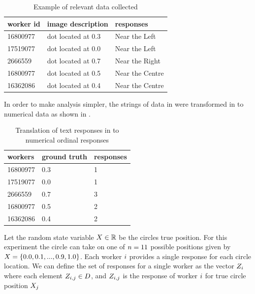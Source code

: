 \begin{table}
\centering
    \begin{tabular}{|l|l|l|}
    \hline
    \textbf{worker id} &    \textbf{image description} & \textbf{responses}       \\ \hline
    16800977      & dot located at 0.3   & Near the Left   \\
    17519077      & dot located at 0.0   & Near the Left   \\
    2666559       & dot located at 0.7   & Near the Right  \\
    16800977      & dot located at 0.5   & Near the Centre \\
    16362086      & dot located at 0.4   & Near the Centre \\ \hline
    \end{tabular}
    \caption{Example of relevant data collected}
  \label{Table:text responses}
\end{table}


In order to make analysis simpler, the strings of data in  were transformed in to numerical data as shown in .


\begin{table}
\centering
    \begin{tabular}{|l|l|l|}
    \hline
    \textbf{workers}  & \textbf{ground truth} & \textbf{responses} \\ \hline
    16800977 & 0.3          & 1         \\
    17519077 & 0.0          & 1         \\
    2666559  & 0.7          & 3         \\
    16800977 & 0.5          & 2         \\
    16362086 & 0.4          & 2         \\ \hline
    \end{tabular}
    \caption{Translation of text responses in to numerical ordinal responses }
  \label{Table:ordinal responses}
\end{table}





Let the random state variable $X \in \mathbb{R}$ be the circles true position. For this experiment the circle can take on one of $n=11$ possible positions given by $X = \lbrace 0.0,0.1,...,0.9,1.0 \rbrace$. Each worker $i$ provides a single response for each circle location. We can define the set of responses for a single worker as the vector $Z_i$ where each element $Z_{i,j} \in D$, and $Z_{i,j}$ is the response of worker $i$ for true circle position $X_j$



